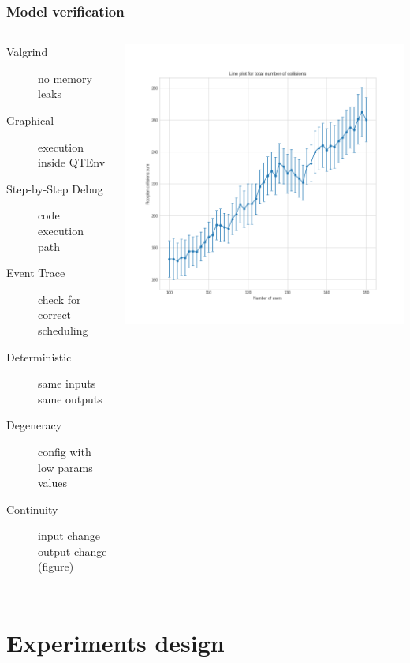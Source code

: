 \documentclass{beamer}
\begin{document}
\begin{frame}
	\frametitle{Model verification}
	\begin{columns}
		\begin{description}
			\item[Valgrind] no memory leaks
			\item[Graphical] execution inside QTEnv
			\item[Step-by-Step Debug] code execution path
			\item[Event Trace] check for correct scheduling
			\item[Deterministic] same inputs \textrightarrow{} same outputs
			\item[Degeneracy] config with low params values
			\item[Continuity] input change \textrightarrow{} output
				change (figure)
		\end{description}
		\includegraphics[width=\textwidth]{img/continuity-collisions}
	\end{columns}
\end{frame}

\section{Experiments design}
\end{document}
